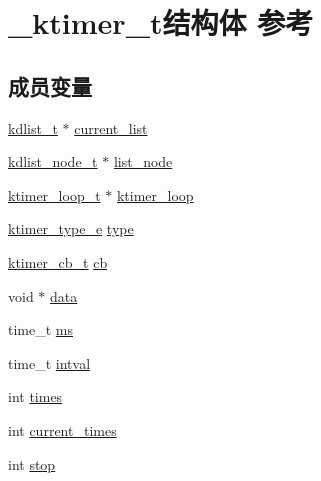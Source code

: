 \hypertarget{a00027}{}\section{\+\_\+ktimer\+\_\+t结构体 参考}
\label{a00027}
\subsection*{成员变量}
\begin{DoxyCompactItemize}
\item 
\hyperlink{a00053_ae098586334a621a23cef7cb17590b618_ae098586334a621a23cef7cb17590b618}{kdlist\+\_\+t} $\ast$ \hyperlink{a00027_a0360c63ae4a93f6cd96c527fdc4992dd_a0360c63ae4a93f6cd96c527fdc4992dd}{current\+\_\+list}
\item 
\hyperlink{a00053_ac701f00a0851c97467ae35c382b316b7_ac701f00a0851c97467ae35c382b316b7}{kdlist\+\_\+node\+\_\+t} $\ast$ \hyperlink{a00027_aa9cab0cc62a4cbeabc92fd6ddbb7ec5f_aa9cab0cc62a4cbeabc92fd6ddbb7ec5f}{list\+\_\+node}
\item 
\hyperlink{a00053_a024af2aa29615e7a811ea6c45438157d_a024af2aa29615e7a811ea6c45438157d}{ktimer\+\_\+loop\+\_\+t} $\ast$ \hyperlink{a00027_aa990d5bd4a8b8079988b9db4c1cc11f5_aa990d5bd4a8b8079988b9db4c1cc11f5}{ktimer\+\_\+loop}
\item 
\hyperlink{a00053_a42e924130e6eb3bd995344f6d3f3e918_a42e924130e6eb3bd995344f6d3f3e918}{ktimer\+\_\+type\+\_\+e} \hyperlink{a00027_a7423b634636770ecb2f6edfbc6bdc73d_a7423b634636770ecb2f6edfbc6bdc73d}{type}
\item 
\hyperlink{a00053_a2333fd0f2c3a85faf586300ca40deed4_a2333fd0f2c3a85faf586300ca40deed4}{ktimer\+\_\+cb\+\_\+t} \hyperlink{a00027_ab819f6a6f6ada412a7f48eacf2bbe329_ab819f6a6f6ada412a7f48eacf2bbe329}{cb}
\item 
void $\ast$ \hyperlink{a00027_a06e03c86d2720dac84bef631e6a8e47a_a06e03c86d2720dac84bef631e6a8e47a}{data}
\item 
time\+\_\+t \hyperlink{a00027_a1a12892ba226e41cc852fd118b7fd08b_a1a12892ba226e41cc852fd118b7fd08b}{ms}
\item 
time\+\_\+t \hyperlink{a00027_a36cb3a8cf9533869881fbcecc06554f9_a36cb3a8cf9533869881fbcecc06554f9}{intval}
\item 
int \hyperlink{a00027_a6b65efd78ea3c5e6cee2c0992cd0cead_a6b65efd78ea3c5e6cee2c0992cd0cead}{times}
\item 
int \hyperlink{a00027_abad8750e54845862d2768b348997db69_abad8750e54845862d2768b348997db69}{current\+\_\+times}
\item 
int \hyperlink{a00027_afbde3157e6d8d730adcfd5463ed7b131_afbde3157e6d8d730adcfd5463ed7b131}{stop}
\end{DoxyCompactItemize}


